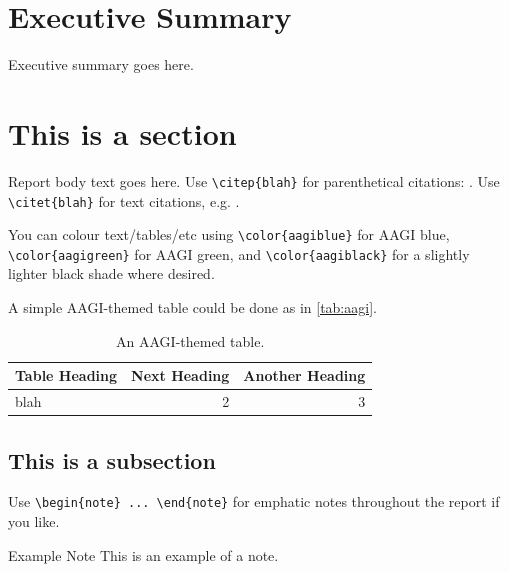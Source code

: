 \documentclass[12pt]{article}
\begin{document}
  
  \clearpage
  \pagestyle{plain}
  \setcounter{page}{1}
  \tableofcontents

  \clearpage
  \section*{Executive Summary}
  Executive summary goes here.
  

  \mainmatter
  \pagestyle{fancy}

  \clearpage
  \section{This is a section}
  
  Report body text goes here. Use \verb|\citep{blah}| for parenthetical
  citations: \citep{blah}. Use \verb|\citet{blah}| for text citations, e.g.
  \citet{blah}.
  
  You can colour text/tables/etc using \verb|\color{aagiblue}|
  for {\color{aagiblue}AAGI blue}, \verb|\color{aagigreen}| for
  {\color{aagigreen}AAGI green}, and \verb|\color{aagiblack}| for
  a {\color{aagiblack}slightly lighter black shade} where desired.
  
  A simple AAGI-themed table could be done as in \autoref{tab:aagi}.
  \begin{table}[h]
    \caption{An AAGI-themed table.}\label{tab:aagi}
    \centering
    \begin{tabular}{| l | r r |}
    \rowcolor{aagiblue} {\color{white}Table Heading} & %
    {\color{white}Next Heading} & {\color{white}Another Heading} \\
    \hline
    blah & 2 & 3 \\
    \hline
    \end{tabular}
  \end{table}

  \subsection{This is a subsection}
  
  Use \verb|\begin{note} ... \end{note}| for emphatic notes throughout
  the report if you like.
  
  \begin{note}
    {\sbf\color{aagiblue!75!black} Example Note}\quad
    This is an example of a note.
  \end{note}
\end{document}
